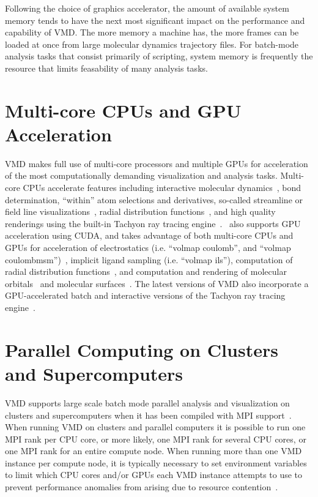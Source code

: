 Following the choice of graphics accelerator, the amount of available
system memory tends to have the next most significant impact on the
performance and capability of VMD.  The more memory a machine has,
the more frames can be loaded at once from large molecular
dynamics trajectory files.  For batch-mode analysis tasks 
that consist primarily of scripting, system memory is frequently the
resource that limits feasability of many analysis tasks.

\section{Multi-core CPUs and GPU Acceleration}
VMD makes full use of multi-core processors and multiple GPUs for 
acceleration of the most computationally demanding visualization 
and analysis tasks.  Multi-core CPUs accelerate features including
interactive molecular dynamics~\cite{ZELL97B,STON2001}, 
bond determination, ``within'' atom selections and derivatives, 
so-called streamline or field line visualizations~\cite{CHAV2014-JS},
radial distribution functions~\cite{LEVI2011-JS}, 
and high quality renderings using the built-in 
Tachyon ray tracing engine~\cite{STON96,STON98}.  
\VMD\ also supports GPU acceleration using CUDA, and takes 
advantage of both multi-core CPUs and GPUs for acceleration of 
electrostatics (i.e. ``volmap coulomb'', and 
``volmap coulombmsm'')~\cite{STON2007,OWEN2008-JS,RODR2008,HARD2009,KIND2009-JS,STON2010,STON2010-JS,ENOS2010-JP,STON2011}, 
implicit ligand sampling (i.e. ``volmap ils''), 
computation of radial distribution functions~\cite{LEVI2011-JS},
and computation and rendering of 
molecular orbitals~\cite{STON2009,STON2010A,STON2011A} and 
molecular surfaces~\cite{KRON2012,ROBE2012-ZLS,STON2013,STON2013A,STON2014,SENE2014A}.
The latest versions of VMD also incorporate a GPU-accelerated batch and 
interactive versions of the Tachyon ray tracing engine~\cite{STON2013A,SENE2014A}.

\section{Parallel Computing on Clusters and Supercomputers}
VMD supports large scale batch mode parallel analysis and visualization on
clusters and supercomputers when it has been compiled with 
MPI support~\cite{STON2013,STON2013A,STON2014,PHIL2014}.
When running VMD on clusters and parallel computers it is possible to
run one MPI rank per CPU core, or more likely, one MPI rank for several 
CPU cores, or one MPI rank for an entire compute node.  When running more
than one VMD instance per compute node, it is typically necessary to set 
environment variables to limit which CPU cores and/or GPUs each VMD 
instance attempts to use to prevent performance anomalies from arising
due to resource contention~\cite{KIND2009-JS}.





